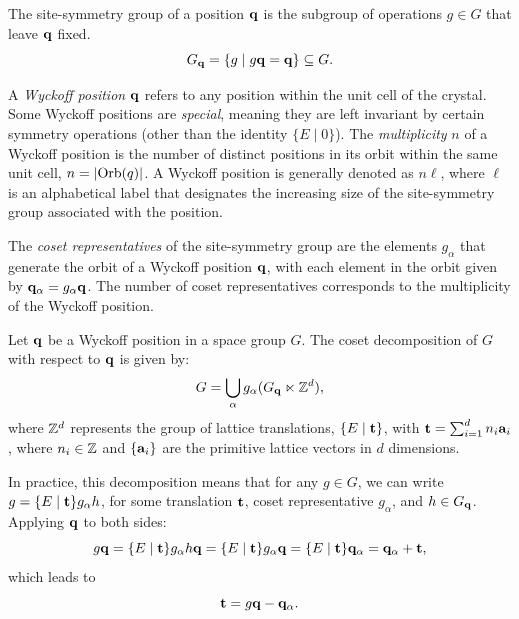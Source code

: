 \documentclass[12pt]{report}
\begin{document}
\begin{definition} \label{def:sitesym}
The site-symmetry group of a position ${\vb{q}}$ is the subgroup of operations $g \in G$ that leave ${\vb{q}}$ fixed.
\begin{equation} \label{eq:site-symmetry_def}
G_{\vb{q}} = \{g \mid g {\vb{q}} = {\vb{q}}\} \subseteq G.
\end{equation}
\end{definition}

\begin{definition} \label{def:wyckpos}
A \textit{Wyckoff position} \( {\vb{q}} \) refers to any position within the unit cell of the crystal. Some Wyckoff positions are \textit{special}, meaning they are left invariant by certain symmetry operations (other than the identity $\{E \mid 0\}$). The \textit{multiplicity} $n$ of a Wyckoff position is the number of distinct positions in its orbit within the same unit cell, $n = \abs{\text{Orb}(q)}$. A Wyckoff position is generally denoted as \( n\ell \), where \( \ell \) is an alphabetical label that designates the increasing size of the site-symmetry group associated with the position.
\end{definition}

\begin{definition} \label{def:cosetrep_wyckoff}
The \textit{coset representatives} of the site-symmetry group are the elements \( g_\alpha \) that generate the orbit of a Wyckoff position \( {\vb{q}} \), with each element in the orbit given by \( {\vb{q}}_\alpha = g_\alpha {\vb{q}} \). The number of coset representatives corresponds to the multiplicity of the Wyckoff position.
\end{definition}

\begin{lemma} \label{lemma:cosetdecomp_wyckoff}
Let \( {\vb{q}} \) be a Wyckoff position in a space group \( G \). The coset decomposition of \( G \) with respect to \( {\vb{q}} \) is given by:
\begin{equation} \label{eq:coset_decomp_wyckoff}
G = \bigcup_\alpha g_\alpha (G_{{\vb{q}}} \ltimes {\mathbb{Z}}^d),
\end{equation}
where \( {\mathbb{Z}}^d \) represents the group of lattice translations, \(\{E\mid {\vb{t}}\}\), with \({\vb{t}} = \sum_{i=1}^d n_i {\vb{a}}_i\), where \( n_i \in {\mathbb{Z}} \) and \(\{{\vb{a}}_i\}\) are the primitive lattice vectors in \( d \) dimensions.

In practice, this decomposition means that for any \( g \in G \), we can write \( g = \{E \mid {\vb{t}}\} g_\alpha h \), for some translation \({\vb{t}}\), coset representative \( g_\alpha \), and \( h \in G_{\vb{q}} \). Applying \( {\vb{q}} \) to both sides:
\begin{equation} \label{eq:coset_decomp_translation_t_step1}
g {\vb{q}} = \{E \mid {\vb{t}}\} g_\alpha h {\vb{q}} = \{E \mid {\vb{t}}\} g_\alpha {\vb{q}} = \{E \mid {\vb{t}}\} {\vb{q}}_\alpha = {\vb{q}}_\alpha + {\vb{t}},
\end{equation}
which leads to
\begin{equation} \label{eq:coset_decomp_translation_t}
{\vb{t}} = g {\vb{q}} - {\vb{q}}_\alpha.
\end{equation}
\end{lemma}
\end{document}
